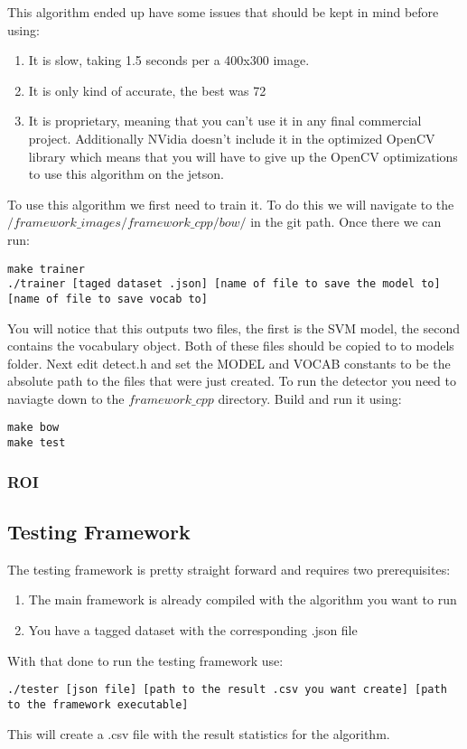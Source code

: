 \documentclass[letterpaper,10pt,titlepage]{article}
\begin{document}
This algorithm ended up have some issues that should be kept in mind before using:
\begin{enumerate}
    \item It is slow, taking 1.5 seconds per a 400x300 image.
    \item It is only kind of accurate, the best was 72%
    \item It is proprietary, meaning that you can't use it in any final commercial project.
        Additionally NVidia doesn't include it in the optimized OpenCV library
        which means that you will have to give up the OpenCV optimizations
        to use this algorithm on the jetson.
\end{enumerate}

To use this algorithm we first need to train it. To do this we will navigate to the
$/framework\_images/framework\_cpp/bow/$ in the git path. Once there we can run:
\begin{lstlisting}
make trainer
./trainer [taged dataset .json] [name of file to save the model to] [name of file to save vocab to]
\end{lstlisting}

You will notice that this outputs two files, the first is the SVM model, the second 
contains the vocabulary object. Both of these files should be copied to to models 
folder. Next edit detect.h and set the MODEL and VOCAB constants to be the absolute
path to the files that were just created. To run the detector you need to naviagte 
down to the $framework\_cpp$ directory. Build and run it using:
\begin{lstlisting}
make bow
make test
\end{lstlisting}

\subsubsection*{ROI}

\subsection*{Testing Framework}

The testing framework is pretty straight forward and requires two prerequisites:
\begin{enumerate}
    \item The main framework is already compiled with the algorithm you want to run
    \item You have a tagged dataset with the corresponding .json file 
\end{enumerate}
With that done to run the testing framework use:
\begin{lstlisting}
./tester [json file] [path to the result .csv you want create] [path to the framework executable]
\end{lstlisting}
This will create a .csv file with the result statistics for the algorithm.
\end{document}

